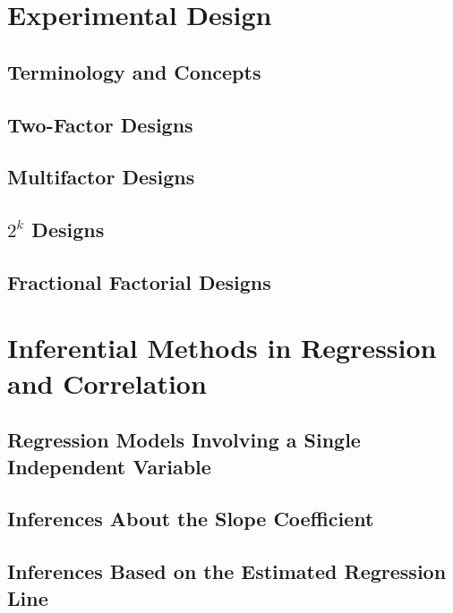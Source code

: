 \documentclass{article}
\begin{document}
\clearpage	
\section{Experimental Design} %

	\subsection{Terminology and Concepts} %
	
	\subsection{Two-Factor Designs} %
	
	\subsection{Multifactor Designs} %
	
	\subsection{$2^k$ Designs} %
	
	\subsection{Fractional Factorial Designs} %

\clearpage	
\section{Inferential Methods in Regression and Correlation} %

	\subsection{Regression Models Involving a Single Independent Variable} %
	
	\subsection{Inferences About the Slope Coefficient} %
	
	\subsection{Inferences Based on the Estimated Regression Line} %
	
\end{document}
